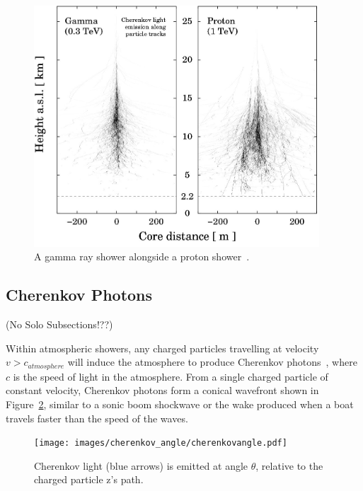   \begin{figure}[ht]
    \centering
    \includegraphics[width=0.95\textwidth]{images/showers_gamma_proton}
    \caption[Gamma Ray and Proton Showers]{
      A gamma ray shower alongside a proton shower~\cite{Bernlohr2008149}.
    }
    \label{fig:gamma_vs_proton_airshower}
  \end{figure}
  
  \FloatBarrier

  \subsection{Cherenkov Photons}\label{sec:cherenkov}
  {\color{red}(No Solo Subsections!??)}

  Within atmospheric showers, any charged particles travelling at velocity $v > c_{atmosphere}$ will induce the atmosphere to produce Cherenkov photons~\cite{cherenkov}, where $c$ is the speed of light in the atmosphere.
  From a single charged particle of constant velocity, Cherenkov photons form a conical wavefront shown in Figure~\ref{fig:cherenkovangle}, similar to a sonic boom shockwave or the wake produced when a boat travels faster than the speed of the waves.

  \begin{figure}[ht]
    \centering
    \texttt{[image: images/cherenkov\_angle/cherenkovangle.pdf]}
    \caption[Chernekov Emission Angle]{
      Cherenkov light (blue arrows) is emitted at angle $\theta$, relative to the charged particle z's path.
    }
    \label{fig:cherenkovangle}
  \end{figure}

